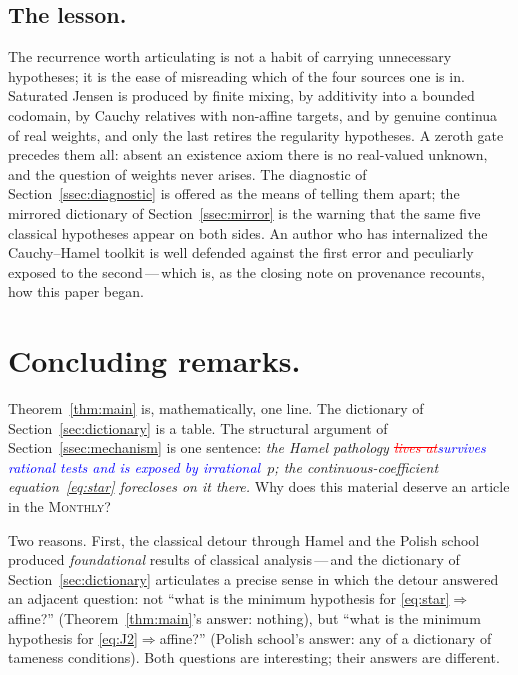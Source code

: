 \documentclass{article}
\newcommand{\ReviewAdd}[1]{\textcolor{blue}{#1}}
\newcommand{\ReviewDel}[1]{\textcolor{red}{\sout{#1}}}
\theoremstyle{plain}
\theoremstyle{definition}
\begin{document}
\subsection{The lesson.}
\label{ssec:lesson}

The recurrence worth articulating is not a habit of carrying
unnecessary hypotheses; it is the ease of misreading which of the
four sources one is in. Saturated Jensen is produced by finite
mixing, by additivity into a bounded codomain, by Cauchy relatives
with non-affine targets, and by genuine continua of real weights,
and only the last retires the regularity hypotheses. A zeroth gate
precedes them all: absent an existence axiom there is no real-valued
unknown, and the question of weights never arises. The diagnostic
of Section~\ref{ssec:diagnostic} is offered as the means of telling
them apart; the mirrored dictionary of Section~\ref{ssec:mirror} is
the warning that the same five classical hypotheses appear on both
sides. An author who has internalized the Cauchy--Hamel toolkit is
well defended against the first error and peculiarly exposed to the
second\,---\,which is, as the closing note on provenance recounts,
how this paper began.

\section{Concluding remarks.}
\label{sec:conclusion}

Theorem~\ref{thm:main} is, mathematically, one line. The dictionary of
Section~\ref{sec:dictionary} is a table. The structural
argument of Section~\ref{ssec:mechanism} is one sentence: \emph{the
Hamel pathology \ReviewDel{lives at}\ReviewAdd{survives rational tests and is exposed by irrational}~$p$; the continuous-coefficient
equation~\eqref{eq:star} forecloses on it there.} Why does this material
deserve an article in the \textsc{Monthly}?

Two reasons. First, the classical detour through Hamel and the Polish
school produced \emph{foundational} results of classical
analysis\,---\,and the dictionary of Section~\ref{sec:dictionary}
articulates a precise sense in which the detour answered an adjacent
question: not ``what is the minimum hypothesis for
\eqref{eq:star}$\Rightarrow$affine?'' (Theorem~\ref{thm:main}'s
answer: nothing), but ``what is the minimum hypothesis for
\eqref{eq:J2}$\Rightarrow$affine?'' (Polish school's answer: any of a
dictionary of tameness conditions). Both questions are interesting;
their answers are different.
\end{document}
